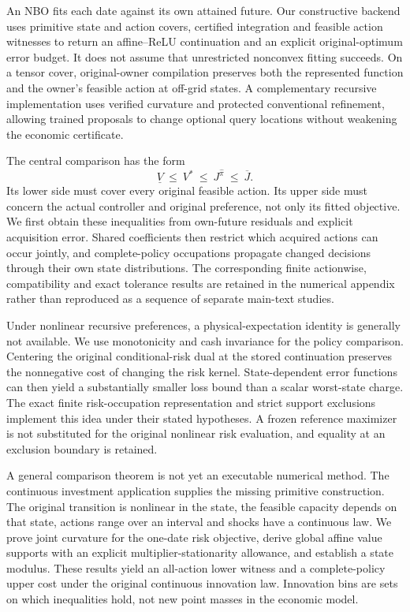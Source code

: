 \documentclass[ecta,nameyear,draft]{econsocart}
\begin{document}
An NBO fits each date against its own attained future. Our constructive backend uses primitive state and action covers, certified integration and feasible action witnesses to return an affine--ReLU continuation and an explicit original-optimum error budget. It does not assume that unrestricted nonconvex fitting succeeds. On a tensor cover, original-owner compilation preserves both the represented function and the owner's feasible action at off-grid states. A complementary recursive implementation uses verified curvature and protected conventional refinement, allowing trained proposals to change optional query locations without weakening the economic certificate.

The central comparison has the form
\[
 \underline V\ \leq\ V^*\ \leq\ J^{\widehat\pi}\ \leq\ \overline J.
\]
Its lower side must cover every original feasible action. Its upper side must concern the actual controller and original preference, not only its fitted objective. We first obtain these inequalities from own-future residuals and explicit acquisition error. Shared coefficients then restrict which acquired actions can occur jointly, and complete-policy occupations propagate changed decisions through their own state distributions. The corresponding finite actionwise, compatibility and exact tolerance results are retained in the numerical appendix rather than reproduced as a sequence of separate main-text studies.

Under nonlinear recursive preferences, a physical-expectation identity is generally not available. We use monotonicity and cash invariance for the policy comparison. Centering the original conditional-risk dual at the stored continuation preserves the nonnegative cost of changing the risk kernel. State-dependent error functions can then yield a substantially smaller loss bound than a scalar worst-state charge. The exact finite risk-occupation representation and strict support exclusions implement this idea under their stated hypotheses. A frozen reference maximizer is not substituted for the original nonlinear risk evaluation, and equality at an exclusion boundary is retained.

A general comparison theorem is not yet an executable numerical method. The continuous investment application supplies the missing primitive construction. The original transition is nonlinear in the state, the feasible capacity depends on that state, actions range over an interval and shocks have a continuous law. We prove joint curvature for the one-date risk objective, derive global affine value supports with an explicit multiplier-stationarity allowance, and establish a state modulus. These results yield an all-action lower witness and a complete-policy upper cost under the original continuous innovation law. Innovation bins are sets on which inequalities hold, not new point masses in the economic model.
\end{document}
